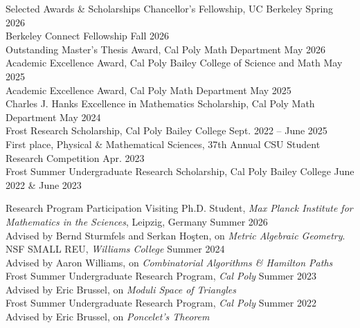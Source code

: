 \documentclass[
	11pt, %
]{cv} %
\begin{document}
\begin{rSection}{Selected Awards \& Scholarships}
	Chancellor's Fellowship, UC Berkeley \dotfill Spring 2026 	 \\
	Berkeley Connect Fellowship \dotfill Fall 2026 \\
	Outstanding Master's Thesis Award, Cal Poly Math Department \dotfill May 2026 \\
	Academic Excellence Award, Cal Poly Bailey College of Science and Math \dotfill May 2025 \\
	Academic Excellence Award, Cal Poly Math Department \dotfill May 2025 \\
	Charles J. Hanks Excellence in Mathematics Scholarship, Cal Poly Math Department \dotfill May 2024 \\
	Frost Research Scholarship, Cal Poly Bailey College \dotfill Sept. 2022 -- June 2025 \\
	First place, Physical \& Mathematical Sciences, 37th Annual CSU Student Research Competition \dotfill Apr. 2023 \\
	Frost Summer Undergraduate Research Scholarship, Cal Poly Bailey College \dotfill June 2022 \& June 2023
\end{rSection}

\begin{rSection}{Research Program Participation}{}{}{}
	Visiting Ph.D. Student, \textit{Max Planck Institute for Mathematics in the Sciences}, Leipzig, Germany \dotfill Summer 2026 \\
	\-\hspace{1cm}Advised by Bernd Sturmfels and Serkan Ho\c{s}ten, on \textit{Metric Algebraic Geometry}. \\
	NSF SMALL REU, \textit{Williams College} \dotfill Summer 2024 \\
	\-\hspace{1cm}Advised by Aaron Williams, on \textit{Combinatorial Algorithms \& Hamilton Paths} \\
	Frost Summer Undergraduate Research Program, \textit{Cal Poly} \dotfill Summer 2023 \\
	\-\hspace{1cm}Advised by Eric Brussel, on \textit{Moduli Space of Triangles} \\
	Frost Summer Undergraduate Research Program, \textit{Cal Poly} \dotfill Summer 2022 \\
	\-\hspace{1cm}Advised by Eric Brussel, on \textit{Poncelet's Theorem}
\end{rSection}
\end{document}
